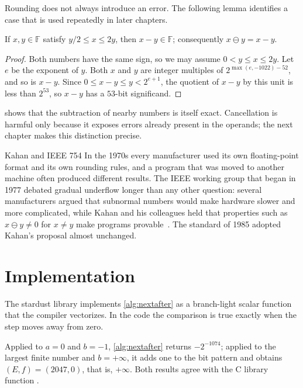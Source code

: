 Rounding does not always introduce an error. The following lemma identifies a case that is used repeatedly in later chapters.

\begin{lemma}[Sterbenz]
\label{lem:sterbenz}
If $x,y\in\mathbb F$ satisfy $y/2\le x\le2y$, then $x-y\in\mathbb F$; consequently $x\ominus y=x-y$.
\end{lemma}

\begin{proof}
Both numbers have the same sign, so we may assume $0<y\le x\le2y$. Let $e$ be the exponent of $y$. Both $x$ and $y$ are integer multiples of $2^{\max(e,-1022)-52}$, and so is $x-y$. Since $0\le x-y\le y<2^{e+1}$, the quotient of $x-y$ by this unit is less than $2^{53}$, so $x-y$ has a $53$-bit significand.
\end{proof}

 shows that the subtraction of nearby numbers is itself exact. Cancellation is harmful only because it exposes errors already present in the operands; the next chapter makes this distinction precise.

\begin{note}{Kahan and IEEE 754}
In the 1970s every manufacturer used its own floating-point format and its own rounding rules, and a program that was moved to another machine often produced different results. The IEEE working group that began in 1977 debated gradual underflow longer than any other question: several manufacturers argued that subnormal numbers would make hardware slower and more complicated, while Kahan and his colleagues held that properties such as $x\ominus y\ne0$ for $x\ne y$ make programs provable~\cite{coonen1981underflow}. The standard of 1985 adopted Kahan's proposal almost unchanged.
\end{note}

\section{Implementation}
\label{sec:fp-implementation}

The stardust library implements \cref{alg:nextafter} as a branch-light scalar function that the compiler vectorizes. In the code the comparison  is true exactly when the step moves away from zero.


Applied to $a=0$ and $b=-1$, \cref{alg:nextafter} returns $-2^{-1074}$; applied to the largest finite number and $b=+\infty$, it adds one to the bit pattern and obtains $(E,f)=(2047,0)$, that is, $+\infty$. Both results agree with the C library function .

